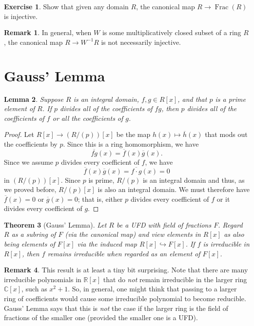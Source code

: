 \documentclass[12pt]{report}
\newtheorem{theorem}{Theorem}[chapter]
\newtheorem{lemma}[theorem]{Lemma}
\numberwithin{equation}{section}
\numberwithin{theorem}{chapter}
\theoremstyle{definition}
\newtheorem{exercise}{Exercise}
\newtheorem*{basic properties}{Basic Properties}
\newtheorem*{Important Remark}{Important Remark}
\newtheorem{remark}[theorem]{Remark}
\newcommand{\C}{\mathbb{C}}
\DeclareMathOperator{\Frac}{Frac}
\begin{document}
\begin{exercise}
Show that given any domain $R$, the canonical map $R \to \Frac(R)$ is injective.
\end{exercise}

\begin{remark}
	In general, when $W$ is some multiplicatively closed subset of a ring $R$, the canonical map $R \longrightarrow W^{-1}R$ is not necessarily injective.
\end{remark}


\section{Gauss' Lemma}


\begin{lemma}\label{lemma to prove Gauss}
Suppose $R$ is an integral domain, $f, g \in R[x]$, and that $p$ is a prime element of $R$. If $p$ divides all of the coefficients of $fg$, then $p$ divides all of the coefficients of $f$ or all the coefficients of $g$.
\end{lemma}


\begin{proof} 
Let $R[x] \to (R/(p))[x]$ be the map $h(x) \mapsto \overline{h}(x)$ that mods out the coefficients by $p$. 
Since this is a ring homomorphism, we have 
$$\overline{f g}(x) = \overline{f}(x) \overline{g}(x).$$ 
Since we assume $p$ divides every coefficient of $f$, we have
$$\overline{f}(x) \overline{g}(x)= \overline{f \cdot g}(x) =  0$$
in $(R/(p))[x]$. Since $p$ is prime, $R/(p)$ is an integral domain and thus, as we proved before, $R/(p)[x]$ is also an integral domain.
We must therefore have $\overline{f}(x) = 0$ or $\overline{g}(x) = 0$; that is, either $p$ divides every coefficient of $f$ or it divides every coefficient of $g$.
\end{proof}



\begin{theorem}[Gauss' Lemma]\label{Gauss Lemma}\label{Gauss Lemma}
Let $R$ be a UFD with field of fractions $F$. Regard $R$ as a subring of $F$ (via the canonical map) and view elements in $R[x]$ as also being elements of $F[x]$ via the induced map $R[x]\hookrightarrow F[x]$.
If $f$ is irreducible in $R[x]$, then $f$ remains irreducible when regarded as an element of $F[x]$.
\end{theorem}


\begin{remark}
This result is at least a tiny bit surprising. Note that there are many irreducible polynomials in $\mathbb{R}[x]$  that do {\em not} remain irreducible in the larger ring $\C[x]$, such as $x^2 + 1$. So, in general, one might think that passing to a larger ring of coefficients would cause some irreducible polynomial to become reducible. Gauss' Lemma says that this is {\em not} the case if the larger ring is the field of fractions of the smaller one (provided the smaller one is a UFD). 
\end{remark}
\end{document}

